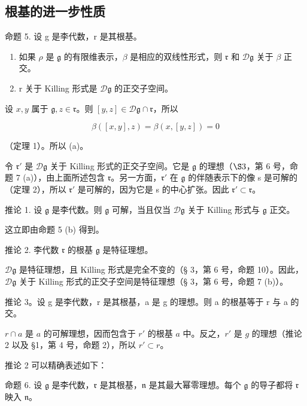 \subsection{根基的进一步性质}

命题 5. 设 g 是李代数，r 是其根基。

\begin{enumerate}
\def\labelenumi{(\alph{enumi})}
\item
  如果 \(\rho\) 是 \(\mathfrak{g}\) 的有限维表示，\(\beta\) 是相应的双线性形式，则 \(\mathfrak{r}\) 和 \(\mathcal{D}\mathfrak{g}\) 关于 \(\beta\) 正交。
\item
  r 关于 Killing 形式是 \(\mathcal{D}\mathfrak{g}\) 的正交子空间。
\end{enumerate}

设 \(x, y\) 属于 \(\mathfrak{g}, z \in \mathfrak{r}\)。则 \([y, z] \in \mathcal{D}\mathfrak{g} \cap \mathfrak{r}\)，所以

\[
\beta ([ x, y ], z) = \beta (x, [ y, z ]) = 0
\]

（定理 1）。所以 (a)。

令 \(\mathfrak{r}'\) 是 \(\mathcal{D}\mathfrak{g}\) 关于 Killing 形式的正交子空间。它是 \(\mathfrak{g}\) 的理想（\(\S 3\)，第 6 号，命题 7 (a)），由上面所述包含 \(\mathfrak{r}\)。另一方面，\(\mathfrak{r}'\) 在 \(\mathfrak{g}\) 的伴随表示下的像 s 是可解的（定理 2），所以 \(\mathfrak{r}'\) 是可解的，因为它是 s 的中心扩张。因此 \(\mathfrak{r}' \subset \mathfrak{r}\)。

推论 1. 设 \(\mathfrak{g}\) 是李代数。则 \(\mathfrak{g}\) 可解，当且仅当 \(\mathcal{D}\mathfrak{g}\) 关于 Killing 形式与 \(\mathfrak{g}\) 正交。

这立即由命题 5 (b) 得到。

推论 2. 李代数 \(\mathfrak{r}\) 的根基 \(\mathfrak{g}\) 是特征理想。

\(\mathcal{D}\mathfrak{g}\) 是特征理想，且 Killing 形式是完全不变的（§ 3，第 6 号，命题 10）。因此，\(\mathcal{D}\mathfrak{g}\) 关于 Killing 形式的正交子空间是特征理想（§ 3，第 6 号，命题 7 (b)）。

推论 3。设 g 是李代数，r 是其根基，a 是 g 的理想。则 a 的根基等于 r 与 a 的交。

\(r \cap a\) 是 \(a\) 的可解理想，因而包含于 \(r'\) 的根基 \(a\) 中。反之，\(r'\) 是 \(g\) 的理想（推论 2 以及 §1，第 4 号，命题 2），所以 \(r' \subset r\)。

推论 2 可以精确表述如下：

命题 6. 设 \(\mathfrak{g}\) 是李代数，\(\mathfrak{r}\) 是其根基，\(\mathfrak{n}\) 是其最大幂零理想。每个 \(\mathfrak{g}\) 的导子都将 \(\mathfrak{r}\) 映入 \(\mathfrak{n}\)。

